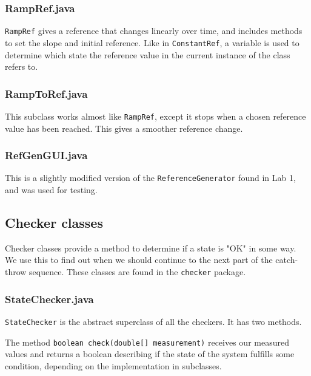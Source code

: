\subsubsection{RampRef.java}
\texttt{RampRef} gives a reference that changes linearly over time, and includes methods to set the slope and initial reference. 
Like in \texttt{ConstantRef}, a variable is used to determine which state the reference value in the current instance of the class refers to.

\subsubsection{RampToRef.java}
This subclass works almost like \texttt{RampRef}, except it stops when a chosen reference value has been reached. 
This gives a smoother reference change.

\subsubsection{RefGenGUI.java}
This is a slightly modified version of the \texttt{ReferenceGenerator} found in Lab 1, and was used for testing.








\subsection{Checker classes}\label{Checkers}
Checker classes provide a method to determine if a state is "OK" in some way. 
We use this to find out when we should continue to the next part of the catch-throw sequence. 
These classes are found in the \texttt{checker} package.
\subsubsection{StateChecker.java}
\texttt{StateChecker} is the abstract superclass of all the checkers. It has two methods.

The method \texttt{boolean check(double[] measurement)} receives our measured values and returns a boolean describing if the state of the system fulfills some condition, depending on the implementation in subclasses.

